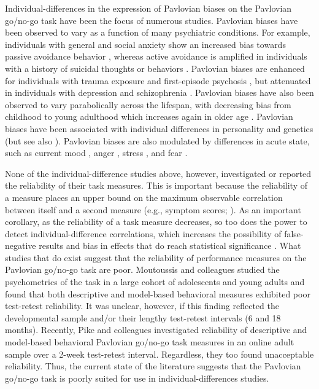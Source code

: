 \documentclass[a4paper,12pt]{article}
\begin{document}
\begin{refsection}[main]
Individual-differences in the expression of Pavlovian biases on the Pavlovian go/no-go task have been the focus of numerous studies. Pavlovian biases have been observed to vary as a function of many psychiatric conditions. For example, individuals with general and social anxiety show an increased bias towards passive avoidance behavior \cite{mkrtchian2017modeling, peterburs2021impact}, whereas active avoidance is amplified in individuals with a history of suicidal thoughts or behaviors \cite{millner2019suicidal}.  Pavlovian biases are enhanced for individuals with trauma exposure \cite{ousdal2018impact} and first-episode psychosis \cite{montagnese2020reinforcement}, but attenuated in individuals with depression \cite{huys2016specificity} and schizophrenia \cite{albrecht2016reduction}. Pavlovian biases have also been observed to vary parabolically across the lifespan, with decreasing bias from childhood to young adulthood which increases again in older age \cite{raab2020adolescents, betts2020learning}. Pavlovian biases have been associated with individual differences in personality \cite{eisinger2020pavlovian} and genetics \cite{richter2014valenced, richter2021motivational} (but see also \cite{montagnese2020reinforcement}). Pavlovian biases are also modulated by differences in acute state, such as current mood \cite{weber2022effects}, anger \cite{wonderlich2020anger}, stress \cite{de2016acute}, and fear \cite{mkrtchian2017threat}. 

None of the individual-difference studies above, however, investigated or reported the reliability of their task measures. This is important because the reliability of a measure places an upper bound on the maximum observable correlation between itself and a second measure (e.g., symptom scores; \cite{zorowitz2023improving}). As an important corollary, as the reliability of a task measure decreases, so too does the power to detect individual-difference correlations, which increases the possibility of false-negative results \cite{Parsons2019-jw} and bias in effects that do reach statistical significance \cite{gelman2014beyond}. What studies that do exist suggest that the reliability of performance measures on the Pavlovian go/no-go task are poor. Moutoussis and colleagues \cite{moutoussis2018change} studied the psychometrics of the task in a large cohort of adolescents and young adults and found that both descriptive and model-based behavioral measures exhibited poor test-retest reliability. It was unclear, however, if this finding reflected the developmental sample and/or their lengthy test-retest intervals (6 and 18 months). Recently, Pike and colleagues \cite{pike2022test} investigated reliability of descriptive and model-based behavioral Pavlovian go/no-go task measures in an online adult sample over a 2-week test-retest interval. Regardless, they too found unacceptable reliability. Thus, the current state of the literature suggests that the Pavlovian go/no-go task is poorly suited for use in individual-differences studies.  


\end{refsection}
\end{document}
